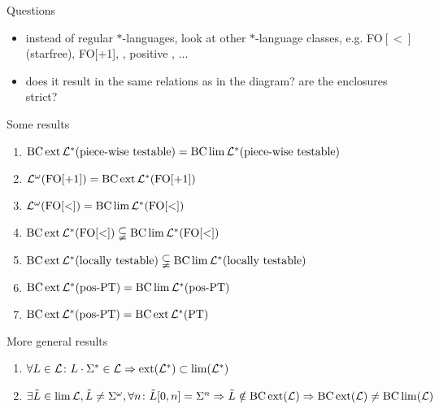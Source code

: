 \documentclass[handout]{beamer}
\begin{document}
\begin{frame}[<+->]{Questions}
\begin{itemize}
\item instead of regular $*$-languages, look at other $*$-language classes, e.g. FO$[<]$ (starfree), FO[+1], \PT, positive \PT, ...
\item does it result in the same relations as in the diagram? are the enclosures strict?
\end{itemize}
\end{frame}

\begin{frame}[<+->]{Some results}
\begin{enumerate}
\item $ \operatorname{BC} \operatorname{ext} \mathcal{L}^* (\textup{\textrm{piece-wise testable}}) = \operatorname{BC} \lim \mathcal{L}^* (\textup{\textrm{piece-wise testable}}) $
\item $ \mathcal{L}^\omega (\mathrm{FO[+1]}) = \operatorname{BC} \operatorname{ext} \mathcal{L}^*(\mathrm{FO[+1]}) $
\item $ \mathcal{L}^\omega (\mathrm{FO[<]}) = \operatorname{BC} \lim \mathcal{L}^*(\mathrm{FO[<]}) $
\item $ \operatorname{BC} \operatorname{ext} \mathcal{L}^*( \mathrm{FO[<]} ) \subsetneqq \operatorname{BC} \lim \mathcal{L}^* ( \mathrm{FO[<]} )  $
\item $ \operatorname{BC} \operatorname{ext} \mathcal{L}^* (\textup{\textrm{locally testable}}) \subsetneqq \operatorname{BC} \lim \mathcal{L}^*(\textup{\textrm{locally testable}}) $
\item $ \operatorname{BC} \operatorname{ext} \mathcal{L}^* (\textup{\textrm{pos-PT}}) = \operatorname{BC} \lim \mathcal{L}^* (\textup{\textrm{pos-PT}}) $
\item $ \operatorname{BC} \operatorname{ext} \mathcal{L}^*(\textup{\textrm{pos-PT}}) = \operatorname{BC} \operatorname{ext} \mathcal{L}^* (\textup{\textrm{PT}}) $
\end{enumerate}
\end{frame}

\begin{frame}[<+->]{More general results}
\begin{enumerate}
\item
$\forall L \in \Lang \colon L \cdot \Sigma^* \in \Lang \linebreak
\Rightarrow \ext(\Lang^*) \subset \lim(\Lang^*)$

\item
$\exists \tilde{L} \in \lim \Lang, \tilde{L} \neq \Sigma^\omega, \forall n \colon \tilde{L}[0,n] = \Sigma^n \linebreak
\Rightarrow \tilde{L} \notin \BC \ext (\Lang) \linebreak
\Rightarrow \BC \ext (\Lang) \neq \BC \lim (\Lang)$

\end{enumerate}
\end{frame}
\end{document}
